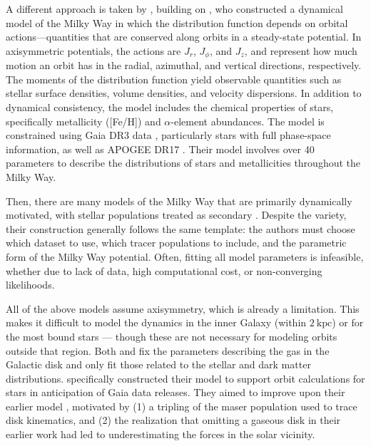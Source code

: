         A different approach is taken by \citet{2024MNRAS.527.1915B}, building on \citet{2023MNRAS.520.1832B}, who constructed a dynamical model of the Milky Way in which the distribution function depends on orbital actions—quantities that are conserved along orbits in a steady-state potential. In axisymmetric potentials, the actions are $J_r$, $J_\phi$, and $J_z$, and represent how much motion an orbit has in the radial, azimuthal, and vertical directions, respectively. The moments of the distribution function yield observable quantities such as stellar surface densities, volume densities, and velocity dispersions. In addition to dynamical consistency, the model includes the chemical properties of stars, specifically metallicity ([Fe/H]) and $\alpha$-element abundances. The model is constrained using Gaia DR3 data \citep{2023A&A...674A...1G}, particularly stars with full phase-space information, as well as APOGEE DR17 \citep{2017AJ....154...94M}. Their model involves over 40 parameters to describe the distributions of stars and metallicities throughout the Milky Way.

        Then, there are many models of the Milky Way that are primarily dynamically motivated, with stellar populations treated as secondary \citep{1991RMxAA..22..255A,2015ApJS..216...29B,2017MNRAS.465...76M,2017A&A...598A..66P,2024ApJ...967...89I}. Despite the variety, their construction generally follows the same template: the authors must choose which dataset to use, which tracer populations to include, and the parametric form of the Milky Way potential. Often, fitting all model parameters is infeasible, whether due to lack of data, high computational cost, or non-converging likelihoods.

        All of the above models assume axisymmetry, which is already a limitation. This makes it difficult to model the dynamics in the inner Galaxy (within $2~\mathrm{kpc}$) or for the most bound stars — though these are not necessary for modeling orbits outside that region. Both \citet{2017MNRAS.465...76M} and \citet{2024MNRAS.527.1915B} fix the parameters describing the gas in the Galactic disk and only fit those related to the stellar and dark matter distributions. \citet{2017MNRAS.465...76M} specifically constructed their model to support orbit calculations for stars in anticipation of Gaia data releases. They aimed to improve upon their earlier model \citep{2011MNRAS.414.2446M}, motivated by (1) a tripling of the maser population used to trace disk kinematics, and (2) the realization that omitting a gaseous disk in their earlier work had led to underestimating the forces in the solar vicinity.

